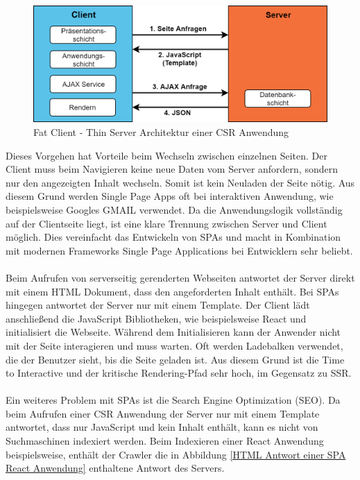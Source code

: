 \documentclass[runningheads]{llncs}
\begin{document}
\begin{figure}[h]
  \centering
  \includegraphics[width=12cm]{images/client}
  \caption{Fat Client - Thin Server Architektur einer CSR Anwendung}
  \label{Fat Client - Thin Server Architektur einer CSR Anwendung}
\end{figure}

Dieses Vorgehen hat Vorteile beim Wechseln zwischen einzelnen Seiten. 
Der Client muss beim Navigieren keine neue Daten vom Server anfordern, 
sondern nur den angezeigten Inhalt wechseln. 
Somit ist kein Neuladen der Seite nötig. 
Aus diesem Grund werden Single Page Apps oft bei interaktiven Anwendung, 
wie beispielsweise Googles GMAIL verwendet. 
Da die Anwendungslogik vollständig auf der Clientseite liegt, 
ist eine klare Trennung zwischen Server und Client möglich. 
Dies vereinfacht das Entwickeln von SPAs und
macht in Kombination mit modernen Frameworks 
Single Page Applications bei Entwicklern sehr beliebt.
\\
\\
Beim Aufrufen von serverseitig gerenderten Webseiten antwortet
der Server direkt mit einem HTML Dokument, 
dass den angeforderten Inhalt enthält. 
Bei SPAs hingegen antwortet der Server nur mit einem Template. 
Der Client lädt anschließend die JavaScript Bibliotheken, 
wie beispielsweise React und initialisiert die Webseite. 
Während dem Initialisieren kann der Anwender nicht mit der Seite interagieren
und muss warten. Oft werden Ladebalken verwendet, 
die der Benutzer sieht, bis die Seite geladen ist. 
Aus diesem Grund ist die Time to Interactive und 
der kritische Rendering-Pfad sehr hoch, im Gegensatz zu SSR.
\\
\\
Ein weiteres Problem mit SPAs ist die Search Engine Optimization (SEO). 
Da beim Aufrufen einer CSR Anwendung der Server nur mit einem Template 
antwortet, dass nur JavaScript und kein Inhalt enthält, 
kann es nicht von Suchmaschinen indexiert werden. 
Beim Indexieren einer React Anwendung beispielsweise, 
enthält der Crawler die in Abbildung \ref{HTML Antwort einer SPA React Anwendung} enthaltene Antwort des Servers. 
\end{document}
